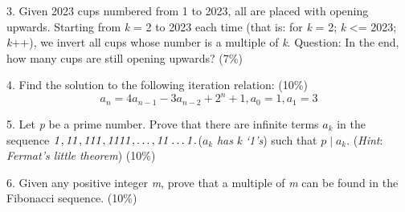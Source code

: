 \documentclass{article}
\begin{document}
3. Given 2023 cups numbered from 1 to 2023, all are placed with opening upwards. Starting from \textit{k} = 2 to 2023 each time (that is: for \textit{k} = 2; \textit{k} <= 2023; \textit{k}++), we invert all cups whose number is a multiple of \textit{k}. Question: In the end, how many cups are still opening upwards? (7\%)  

4. Find the solution to the following iteration relation: (10\%)
\[\mathit{a}_{n} = 4\mathit{a}_{n-1} - 3\mathit{a}_{n-2} + 2^{n} + 1,\mathit{a}_{0} = 1,\mathit{a}_{1} = 3\]

5. Let \textit{p} be a prime number. Prove that there are infinite terms $\mathit{a}_{k}$ in the sequence $\mathit{1, 11, 111, 1111, \ldots , 11\ldots1}.\\
$($\mathit{a}_{k}$ \textit{has} \textit{k} \textit{`1's}) such that $\mathit{p} \mid \mathit{a}_{k}$. (\textit{Hint}: \textit{Fermat's little theorem}) (10\%) 

6. Given any positive integer \textit{m}, prove that a multiple of \textit{m} can be found in the Fibonacci sequence. (10\%)
\end{document}
